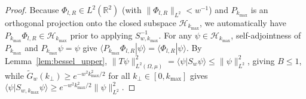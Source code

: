 \documentclass[aps,pra,reprint,nofootinbib,floatfix,longbibliography]{revtex4-2}
\theoremstyle{remark}
\newcommand{\braket}[2]{\langle #1 | #2 \rangle}
\newcommand{\norm}[1]{\lVert #1 \rVert}
\begin{document}
\begin{proof}
Because $\Phi_{l,R} \in L^2(\mathbb{R}^2)$ (with $\norm{\Phi_{l,R}}_{L^2} < w^{-1}$) and $P_{k_{\max}}$ is an orthogonal projection onto the closed subspace $\mathcal{H}_{k_{\max}}$, we automatically have $P_{k_{\max}}\Phi_{l,R} \in \mathcal{H}_{k_{\max}}$ prior to applying $S_{w,k_{\max}}^{-1}$. For any $\psi \in \mathcal{H}_{k_{\max}}$, self-adjointness of $P_{k_{\max}}$ and $P_{k_{\max}}\psi = \psi$ give $\braket{P_{k_{\max}}\Phi_{l,R}}{\psi} = \braket{\Phi_{l,R}}{\psi}$. By Lemma~\ref{lem:bessel_upper}, $\norm{T\psi}_{L^2(\Omega,\mu)}^2 = \braket{\psi}{S_w\psi} \le \norm{\psi}_{L^2}^2$, giving $B \le 1$, while $\widetilde{G}_w(k_\perp) \ge e^{-w^2 k_{\max}^2/2}$ for all $k_\perp \in [0,k_{\max}]$ gives $\braket{\psi}{S_{w,k_{\max}}\psi} \ge e^{-w^2 k_{\max}^2/2}\norm{\psi}_{L^2}^2$.


\end{proof}
\end{document}
